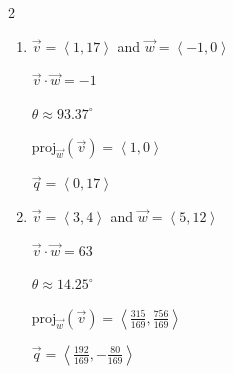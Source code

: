 \documentclass{ximera}
\begin{document}
 
\begin{multicols}{2} \raggedcolumns 
\begin{enumerate}
\setcounter{enumi}{\value{HW}}


\item $\overrightarrow{v} = \left\langle 1, 17 \right\rangle$ and $\overrightarrow{w} = \left\langle -1, 0 \right\rangle$

 $\overrightarrow{v} \cdot \overrightarrow{w} = -1$

 $\theta \approx  93.37^{\circ}$ 

 $\text{proj}_{\overrightarrow{w}}(\overrightarrow{v}) = \left\langle 1, 0 \right\rangle$

 $\overrightarrow{q} = \left\langle 0, 17 \right\rangle$

\vfill

\item $\overrightarrow{v} = \left\langle 3, 4 \right\rangle$ and $\overrightarrow{w} = \left\langle 5, 12 \right\rangle$

 $\overrightarrow{v} \cdot \overrightarrow{w} = 63$

 $\theta  \approx  14.25^{\circ}$ 

 $\text{proj}_{\overrightarrow{w}}(\overrightarrow{v}) = \left\langle \frac{315}{169}, \frac{756}{169} \right\rangle$

 $\overrightarrow{q} = \left\langle \frac{192}{169}, -\frac{80}{169} \right\rangle$
 
\setcounter{HW}{\value{enumi}}
\end{enumerate}
\end{multicols}
 
 
 
\end{document}
